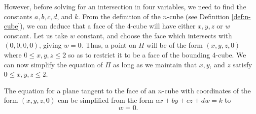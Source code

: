 \noindent %
However, before solving for an intersection in four variables, we need to find the constants $a, b, c, d$, and $k$. From the definition of the $n$-cube (see Definition \ref{def:n-cube}), we can deduce that a face of the 4-cube will have either $x,y,z$ or $w$ constant. Let us take $w$ constant, and choose the face which intersects with $(0,0,0,0)$, giving $w=0$. Thus, a point on $\Pi$ will be of the form $(x, y, z, 0)$ where $0\leq x, y, z \leq 2$ so as to restrict it to be a face of the bounding 4-cube. We can now simplify the equation of $\Pi$ as long as we maintain that $x, y$, and $z$ satisfy $0\leq x, y, z \leq 2$. 
\begin{lemma}
    The equation for a plane tangent to the face of an $n$-cube with coordinates of the form $(x, y, z, 0)$ can be simplified from the form $ax+by+cz+dw=k$ to
    \begin{equation}\label{eq:cube face} %
        w=0.
    \end{equation}
\end{lemma}
